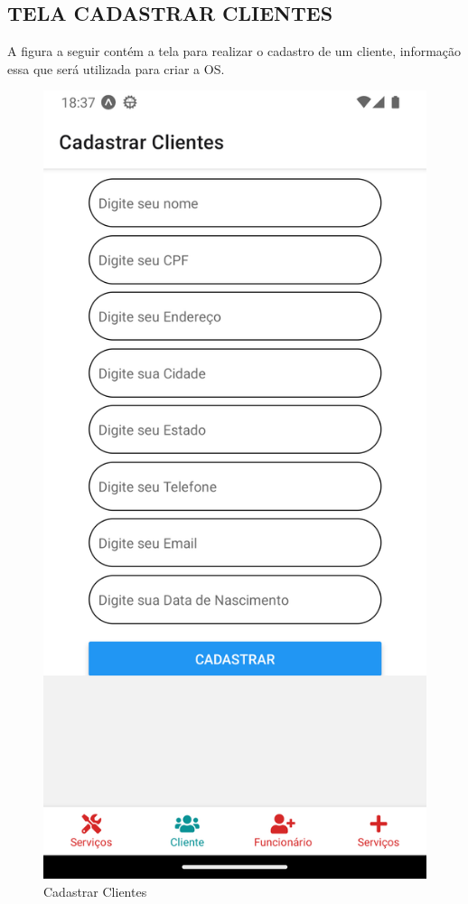 \subsection{TELA CADASTRAR CLIENTES}
A figura a seguir contém a tela para realizar o cadastro de um cliente, informação essa que será utilizada para criar a OS.
\begin{figure}[htb]
	\caption{\label{fig_diagrama-classes} Cadastrar Clientes}
	\begin{center}
	    \includegraphics[width=0.5\linewidth]{imagens/tela-cadastrar-cliente.png}
	\end{center}
\end{figure}

\newpage

